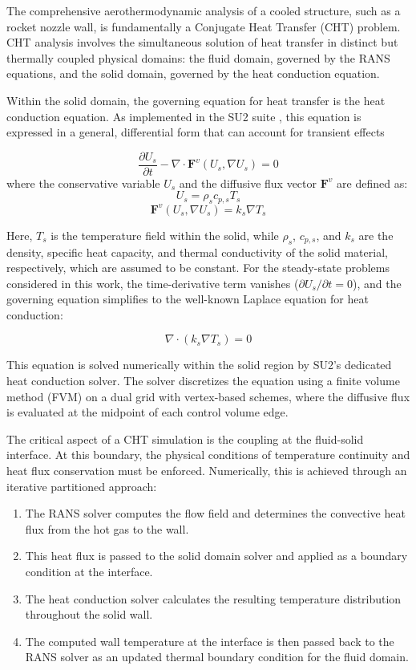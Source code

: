 \documentclass[tg, EN]{ufabcFHZh_tg}
\begin{document}
The comprehensive aerothermodynamic analysis of a cooled structure, such as a rocket nozzle wall, is fundamentally a Conjugate Heat Transfer (CHT) problem. CHT analysis involves the simultaneous solution of heat transfer in distinct but thermally coupled physical domains: the fluid domain, governed by the RANS equations, and the solid domain, governed by the heat conduction equation.

Within the solid domain, the governing equation for heat transfer is the heat conduction equation. As implemented in the SU2 suite \citep{su2_theory}, this equation is expressed in a general, differential form that can account for transient effects

\begin{equation}
\frac{\partial U_s}{\partial t} - \nabla \cdot \mathbf{F}^v(U_s, \nabla U_s) = 0
\label{eq:heat_conduction_transient}
\end{equation}
where the conservative variable $U_s$ and the diffusive flux vector $\mathbf{F}^v$ are defined as:
$$U_s = \rho_s c_{p,s} T_s$$
$$\mathbf{F}^v(U_s, \nabla U_s) = k_s \nabla T_s$$

Here, $T_s$ is the temperature field within the solid, while $\rho_s$, $c_{p,s}$, and $k_s$ are the density, specific heat capacity, and thermal conductivity of the solid material, respectively, which are assumed to be constant. For the steady-state problems considered in this work, the time-derivative term vanishes ($\partial U_s / \partial t = 0$), and the governing equation simplifies to the well-known Laplace equation for heat conduction:

\begin{equation}
\nabla \cdot (k_s \nabla T_s) = 0
\label{eq:heat_conduction_steady}
\end{equation}

This equation is solved numerically within the solid region by SU2's dedicated heat conduction solver. The solver discretizes the equation using a finite volume method (FVM) on a dual grid with vertex-based schemes, where the diffusive flux is evaluated at the midpoint of each control volume edge.

The critical aspect of a CHT simulation is the coupling at the fluid-solid interface. At this boundary, the physical conditions of temperature continuity and heat flux conservation must be enforced. Numerically, this is achieved through an iterative partitioned approach:

\begin{enumerate}
    \item The RANS solver computes the flow field and determines the convective heat flux from the hot gas to the wall.
    \item This heat flux is passed to the solid domain solver and applied as a boundary condition at the interface.
    \item The heat conduction solver calculates the resulting temperature distribution throughout the solid wall.
    \item The computed wall temperature at the interface is then passed back to the RANS solver as an updated thermal boundary condition for the fluid domain.
\end{enumerate}
\end{document}
